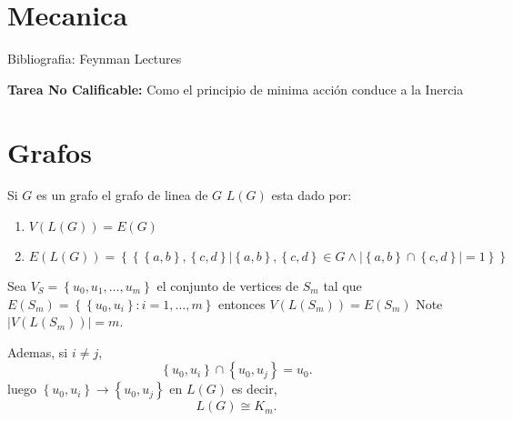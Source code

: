 \documentclass{report}
\begin{document}
    \section{Mecanica}

    Bibliografia: Feynman Lectures



    \textbf{Tarea No Calificable:} Como el principio de minima acción conduce a la Inercia

    \section{Grafos}

    Si $G$ es un grafo el grafo de linea de $G$ $L\left( G \right) $ esta dado por:
    \begin{enumerate}
      \item $V\left( L\left( G \right)  \right) = E\left( G \right) $ 
      \item $E\left( L\left( G \right)  \right) = \left\{ \left\{ \left\{ a,b \right\} , \left\{ c,d \right\} | \left\{ a,b \right\} ,\left\{ c,d \right\} \in G \land |\left\{ a,b \right\} \cap \left\{ c,d \right\}| = 1 \right\}  \right\} $
    \end{enumerate}

    
\begin{myproof}
  Sea $V_S=\left\{ u_0,u_1,\ldots,u_m \right\} $ el conjunto de vertices de $S_m$ tal que $E\left( S_m \right) = \left\{ \left\{ u_0,u_i \right\} : i=1,\ldots,m \right\} $ entonces $V\left( L\left( S_m \right)  \right) = E\left( S_m \right) $ Note $|V\left( L\left( S_m \right)  \right) | = m$.

  Ademas, si $i\neq j$,\[
  \left\{ u_0,u_i \right\} \cap \left\{ u_0,u_j \right\} = u_0
  .\] luego $\left\{ u_0,u_i \right\} \to \left\{ u_0,u_j \right\} $ en $L\left( G \right) $ es decir, \[
  L\left( G \right) \cong  K_m
  .\] 
 
\end{myproof}

\end{document}
